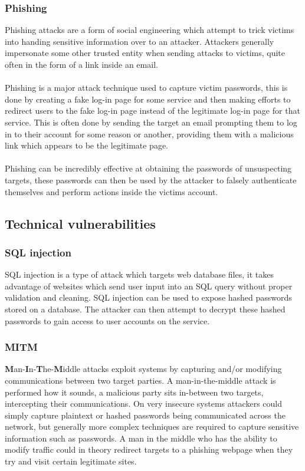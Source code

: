 \documentclass[11pt]{article}
\begin{document}
\subsubsection{Phishing}
Phishing attacks are a form of social engineering which attempt to trick victims into handing sensitive information over to an attacker.
Attackers generally impersonate some other trusted entity when sending attacks to victims, quite often in the form of a link inside an email.\\\\
Phishing is a major attack technique used to capture victim passwords, this is done by creating a fake log-in page for some service and then making efforts to redirect users to the fake log-in page instead of the legitimate log-in page for that service. This is often done by sending the target an email prompting them to log in to their account for some reason or another, providing them with a malicious link which appears to be the legitimate page.\\\\
Phishing can be incredibly effective at obtaining the passwords of unsuspecting targets, these passwords can then be used by the attacker to falsely authenticate themselves and perform actions inside the victims account.

\subsection{Technical vulnerabilities}
\subsubsection{SQL injection}
SQL injection is a type of attack which targets web database files, it takes advantage of websites which send user input into an SQL query without proper validation and cleaning.
SQL injection can be used to expose hashed passwords stored on a database. The attacker can then attempt to decrypt these hashed passwords to gain access to user accounts on the service.

\subsubsection{MITM}
\textbf{M}an-\textbf{I}n-\textbf{T}he-\textbf{M}iddle attacks exploit systems by capturing and/or modifying communications between two target parties.
A man-in-the-middle attack is performed how it sounds, a malicious party sits in-between two targets, intercepting their communications.
On very insecure systems attackers could simply capture plaintext or hashed passwords being communicated across the network, but generally more complex techniques are required to capture sensitive information such as passwords. A man in the middle who has the ability to modify traffic could in theory redirect targets to a phishing webpage when they try and visit certain legitimate sites.
\end{document}
